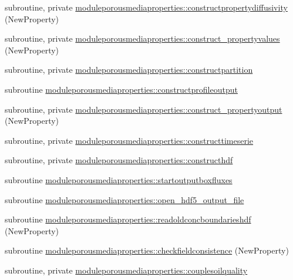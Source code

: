 \begin{DoxyCompactItemize}
\item 
subroutine, private \mbox{\hyperlink{namespacemoduleporousmediaproperties_a03d5423382489d1918532f58f478c446}{moduleporousmediaproperties\+::constructpropertydiffusivity}} (New\+Property)
\item 
subroutine, private \mbox{\hyperlink{namespacemoduleporousmediaproperties_a72fa2352db155b8e701aa97c7aad155c}{moduleporousmediaproperties\+::construct\+\_\+propertyvalues}} (New\+Property)
\item 
subroutine, private \mbox{\hyperlink{namespacemoduleporousmediaproperties_a61c528a081f6e7bd050ab2482d187fe5}{moduleporousmediaproperties\+::constructpartition}}
\item 
subroutine \mbox{\hyperlink{namespacemoduleporousmediaproperties_a8c45fef7355c15cfadf2a6d30d9bbb24}{moduleporousmediaproperties\+::constructprofileoutput}}
\item 
subroutine, private \mbox{\hyperlink{namespacemoduleporousmediaproperties_acd8b0a3775ea88f8c55b0a2d1eaa957f}{moduleporousmediaproperties\+::construct\+\_\+propertyoutput}} (New\+Property)
\item 
subroutine, private \mbox{\hyperlink{namespacemoduleporousmediaproperties_af8b1e7f8c04441c79ef987887896d90a}{moduleporousmediaproperties\+::constructtimeserie}}
\item 
subroutine, private \mbox{\hyperlink{namespacemoduleporousmediaproperties_aecdb9ca882593072d63d590749b53ee9}{moduleporousmediaproperties\+::constructhdf}}
\item 
subroutine \mbox{\hyperlink{namespacemoduleporousmediaproperties_a0c7ca57252cdb274ae0ce23c3deeba74}{moduleporousmediaproperties\+::startoutputboxfluxes}}
\item 
subroutine \mbox{\hyperlink{namespacemoduleporousmediaproperties_a03262673fc0a9c3eece9a35a7e11e852}{moduleporousmediaproperties\+::open\+\_\+hdf5\+\_\+output\+\_\+file}}
\item 
subroutine \mbox{\hyperlink{namespacemoduleporousmediaproperties_abf58df3d1437a63cdfba7d236b8d0fa9}{moduleporousmediaproperties\+::readoldconcboundarieshdf}} (New\+Property)
\item 
subroutine \mbox{\hyperlink{namespacemoduleporousmediaproperties_a2f7af623d77295c6b462fed30cf66e1b}{moduleporousmediaproperties\+::checkfieldconsistence}} (New\+Property)
\item 
subroutine, private \mbox{\hyperlink{namespacemoduleporousmediaproperties_a61f775b3725813d36065a3b82e4cdb20}{moduleporousmediaproperties\+::couplesoilquality}}
\item 

\end{DoxyCompactItemize}
